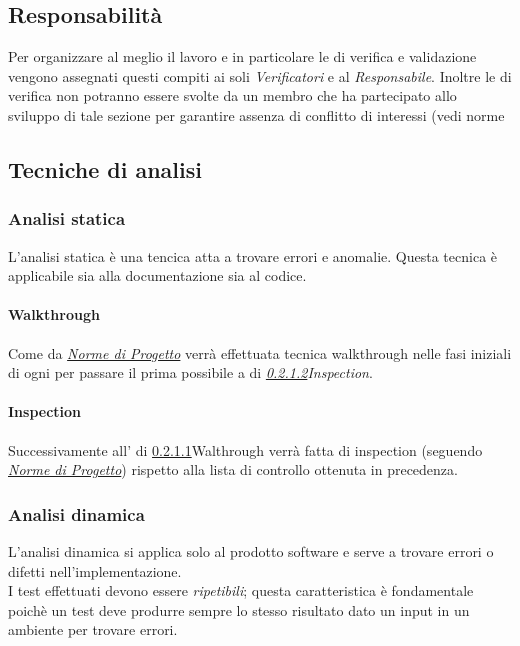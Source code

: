 \documentclass{scalatekids-article}
\begin{document}
\subsection{Responsabilità}
Per organizzare al meglio il lavoro e in particolare le  di verifica e validazione vengono assegnati questi compiti ai soli \textit{Verificatori} e al \textit{Responsabile}. Inoltre le  di verifica non potranno essere svolte da un membro che ha partecipato allo sviluppo di tale sezione per garantire assenza di conflitto di interessi (vedi norme  %
\subsection{Tecniche di analisi}
\subsubsection{Analisi statica}
L'analisi statica è una tencica atta a trovare errori e anomalie. Questa tecnica è applicabile sia alla documentazione sia al codice.
\paragraph{Walkthrough}
\label{sec:walkthrough}Come da \textit{\href{run:../Interni/NormeDiProgetto_v1.0.0.pdf}{Norme di Progetto}} verrà effettuata tecnica walkthrough nelle fasi iniziali di ogni  per passare il prima possibile a  di \textit{\ref{sec:inspection}{Inspection}}.
\paragraph{Inspection}
\label{sec:inspection}Successivamente all' di \ref{sec:walkthrough}{Walthrough} verrà fatta  di inspection (seguendo \textit{\href{run:../Interni/NormeDiProgetto_v1.0.0.pdf}{Norme di Progetto}}) rispetto alla lista di controllo ottenuta in precedenza.
\subsubsection{Analisi dinamica}
L'analisi dinamica si applica solo al prodotto software e serve a trovare errori o difetti nell'implementazione.\\I test effettuati devono essere \textit{ripetibili}; questa caratteristica è fondamentale poichè un test deve produrre sempre lo stesso risultato dato un input in un ambiente per trovare errori.
\end{document}
